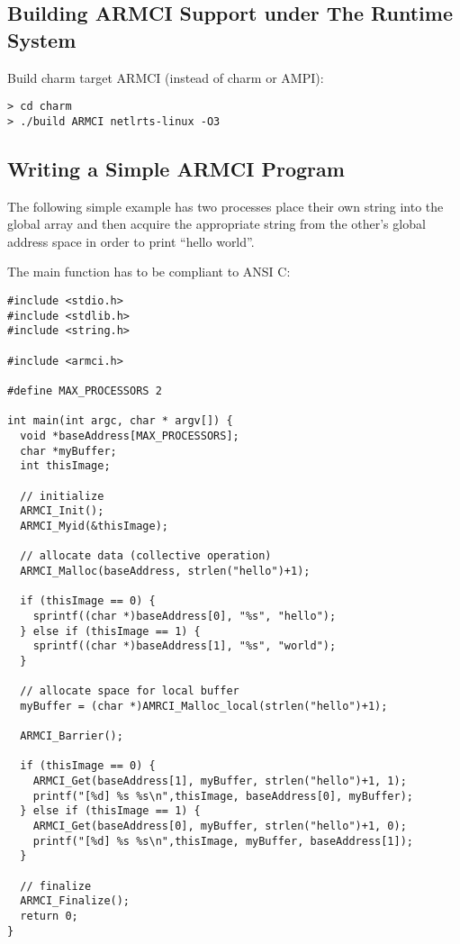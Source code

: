 \documentclass[10pt]{article}
\begin{document}
\subsection{Building ARMCI Support under The \charmpp{} Runtime System}
\label{sec::charm build}

Build charm target ARMCI (instead of charm or AMPI):
\begin{verbatim}
> cd charm
> ./build ARMCI netlrts-linux -O3
\end{verbatim}

\subsection{Writing a Simple ARMCI Program}
\label{sec::simple program}

The following simple example has two processes place their own string
into the global array and then acquire the appropriate string from the
other's global address space in order to print ``hello world''. 

The main function has to be compliant to ANSI C:

\begin{verbatim}
#include <stdio.h>
#include <stdlib.h>
#include <string.h>

#include <armci.h>

#define MAX_PROCESSORS 2

int main(int argc, char * argv[]) {
  void *baseAddress[MAX_PROCESSORS];
  char *myBuffer;
  int thisImage;
  
  // initialize
  ARMCI_Init();
  ARMCI_Myid(&thisImage);

  // allocate data (collective operation)
  ARMCI_Malloc(baseAddress, strlen("hello")+1);
 
  if (thisImage == 0) {
    sprintf((char *)baseAddress[0], "%s", "hello");
  } else if (thisImage == 1) {
    sprintf((char *)baseAddress[1], "%s", "world");
  }

  // allocate space for local buffer
  myBuffer = (char *)AMRCI_Malloc_local(strlen("hello")+1);
  
  ARMCI_Barrier();

  if (thisImage == 0) {
    ARMCI_Get(baseAddress[1], myBuffer, strlen("hello")+1, 1);
    printf("[%d] %s %s\n",thisImage, baseAddress[0], myBuffer);
  } else if (thisImage == 1) {
    ARMCI_Get(baseAddress[0], myBuffer, strlen("hello")+1, 0);
    printf("[%d] %s %s\n",thisImage, myBuffer, baseAddress[1]);
  }

  // finalize
  ARMCI_Finalize();
  return 0;
}
\end{verbatim}
\end{document}
